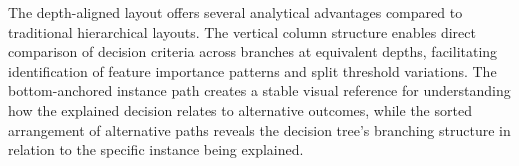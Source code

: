 The depth-aligned layout offers several analytical advantages compared to traditional hierarchical layouts. The vertical column structure enables direct comparison of decision criteria across branches at equivalent depths, facilitating identification of feature importance patterns and split threshold variations. The bottom-anchored instance path creates a stable visual reference for understanding how the explained decision relates to alternative outcomes, while the sorted arrangement of alternative paths reveals the decision tree's branching structure in relation to the specific instance being explained.


